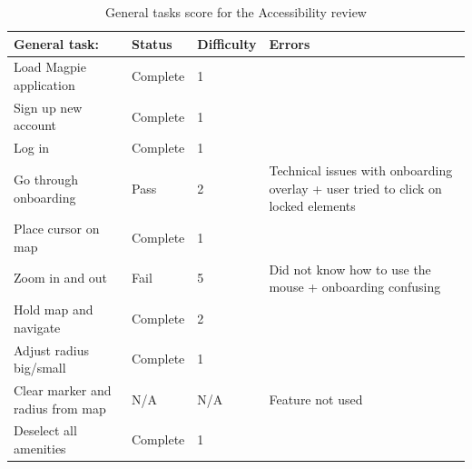 \begin{table}[h!]
    \centering
    \caption{General tasks score for the Accessibility review}
    \begin{tabular}{|p{}|p{}|p{}|p{}|}
        \hline
        \textbf{General task:}           & \textbf{Status} & \textbf{Difficulty} & \textbf{Errors}                                                                   \\
        \hline
        Load Magpie application          & Complete        & 1                   &                                                                                   \\
        \hline
        Sign up new account              & Complete        & 1                   &                                                                                   \\
        \hline
        Log in                           & Complete        & 1                   &                                                                                   \\
        \hline
        Go through onboarding            & Pass            & 2                   & Technical issues with onboarding overlay + user tried to click on locked elements \\
        \hline
        Place cursor on map              & Complete        & 1                   &                                                                                   \\
        \hline
        Zoom in and out                  & Fail            & 5                   & Did not know how to use the mouse + onboarding confusing                          \\
        \hline
        Hold map and navigate            & Complete        & 2                   &                                                                                   \\
        \hline
        Adjust radius big/small          & Complete        & 1                   &                                                                                   \\
        \hline
        Clear marker and radius from map & N/A             & N/A                 & Feature not used                                                                  \\
        \hline
        Deselect all amenities           & Complete        & 1                   &                                                                                   \\

\end{tabular}
\end{table}
